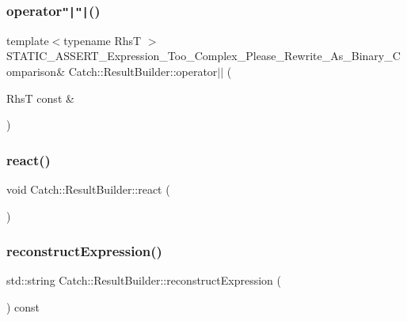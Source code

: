 \hypertarget{class_catch_1_1_result_builder_ad489243e89e9f0ec3cb1f95392a537de}{}\label{class_catch_1_1_result_builder_ad489243e89e9f0ec3cb1f95392a537de} 
\subsubsection{\texorpdfstring{operator\texttt{"|}\texttt{"|}()}{operator||()}}
{\footnotesize\ttfamily template$<$typename RhsT $>$ \\
S\+T\+A\+T\+I\+C\+\_\+\+A\+S\+S\+E\+R\+T\+\_\+\+Expression\+\_\+\+Too\+\_\+\+Complex\+\_\+\+Please\+\_\+\+Rewrite\+\_\+\+As\+\_\+\+Binary\+\_\+\+Comparison\& Catch\+::\+Result\+Builder\+::operator$\vert$$\vert$ (\begin{DoxyParamCaption}\item[{RhsT const \&}]{ }\end{DoxyParamCaption})}

\hypertarget{class_catch_1_1_result_builder_a3085cdc46533d45bed6f652a2ac295c0}{}\label{class_catch_1_1_result_builder_a3085cdc46533d45bed6f652a2ac295c0} 
\subsubsection{\texorpdfstring{react()}{react()}}
{\footnotesize\ttfamily void Catch\+::\+Result\+Builder\+::react (\begin{DoxyParamCaption}{ }\end{DoxyParamCaption})}

\hypertarget{class_catch_1_1_result_builder_aebe098f8d206a89995076b95a3348195}{}\label{class_catch_1_1_result_builder_aebe098f8d206a89995076b95a3348195} 
\subsubsection{\texorpdfstring{reconstruct\+Expression()}{reconstructExpression()}}
{\footnotesize\ttfamily std\+::string Catch\+::\+Result\+Builder\+::reconstruct\+Expression (\begin{DoxyParamCaption}{ }\end{DoxyParamCaption}) const}

